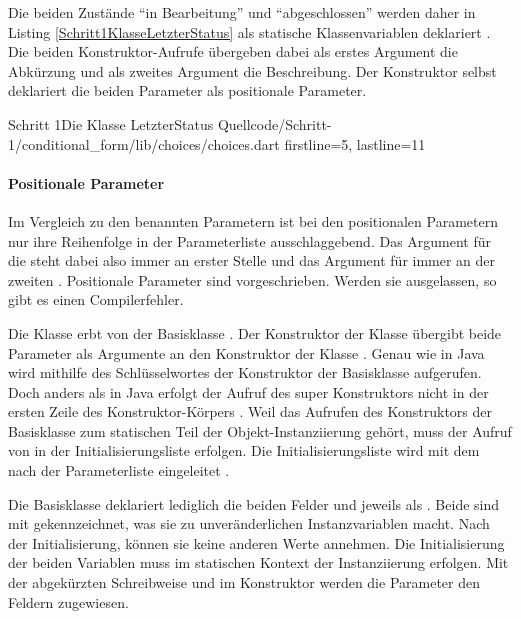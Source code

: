 Die beiden Zustände \enquote{in Bearbeitung} und \enquote{abgeschlossen} werden daher in Listing \ref{Schritt1KlasseLetzterStatus} als statische Klassenvariablen deklariert . Die beiden Konstruktor-Aufrufe übergeben dabei als erstes Argument die Abkürzung und als zweites Argument die Beschreibung. Der Konstruktor selbst  deklariert die beiden Parameter als positionale Parameter.



\begin{alexlisting}{Schritt 1}{Die Klasse LetzterStatus}
  {Quellcode/Schritt-1/conditional_form/lib/choices/choices.dart}
  {firstline=5, lastline=11}
  \label{lst:Schritt1KlasseLetzterStatus}
\end{alexlisting}



\paragraph{Positionale Parameter}

Im Vergleich zu den benannten Parametern ist bei den positionalen Parametern nur ihre Reihenfolge in der Parameterliste ausschlaggebend. Das Argument für die  steht dabei also immer an erster Stelle und das Argument für  immer an der zweiten . Positionale Parameter sind vorgeschrieben. Werden sie ausgelassen, so gibt es einen Compilerfehler. 

Die Klasse  erbt von der Basisklasse  . Der Konstruktor der Klasse  übergibt beide Parameter als Argumente an den Konstruktor der Klasse . Genau wie in Java wird mithilfe des Schlüsselwortes  der Konstruktor der Basisklasse aufgerufen. Doch anders als in Java erfolgt der Aufruf des super Konstruktors nicht in der ersten Zeile des Konstruktor-Körpers . Weil das Aufrufen des Konstruktors der Basisklasse zum statischen Teil der Objekt-Instanziierung gehört, muss der Aufruf von  in der Initialisierungsliste erfolgen. Die Initialisierungsliste wird mit dem \IC{:} nach der Parameterliste eingeleitet .

Die Basisklasse  \Lst{\ref{lst:Schritt1KlasseChoice}} deklariert lediglich die beiden Felder  und  jeweils als  . Beide sind mit  gekennzeichnet, was sie zu unveränderlichen Instanzvariablen macht. Nach der Initialisierung, können sie keine anderen Werte annehmen.  Die Initialisierung der beiden Variablen muss im statischen Kontext der Instanziierung erfolgen. Mit der abgekürzten Schreibweise  und   im Konstruktor  werden die Parameter den Feldern zugewiesen.

